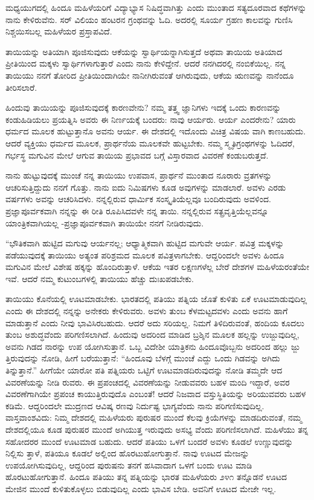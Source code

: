 ಮಧ್ಯಯುಗದಲ್ಲಿ ಹಿಂದೂ ಮಹಿಳೆಯರಿಗೆ ವಿದ್ಯಾಭ್ಯಾಸ ನಿಷಿದ್ಧವಾಗಿತ್ತು ಎಂದು ಮುಂತಾದ ಸತ್ಯದೂರವಾದ ಕಥೆಗಳನ್ನು ನಾನು ಕೇಳಿರುವೆನು. ಸರ್ ವಿಲಿಯಂ ಹಂಟರನ  ಗ್ರಂಥವನ್ನು ಓದಿ. ಅದರಲ್ಲಿ ಸೂರ್ಯ ಗ್ರಹಣ ಕಾಲವನ್ನು ಗುಣಿಸಿ ನಿಶ್ಚಯಿಸಬಲ್ಲ ಮಹಿಳೆಯರ ಪ್ರಸ್ತಾಪವಿದೆ.

ತಾಯಿಯನ್ನು ಅತಿಯಾಗಿ ಪೂಜಿಸುವುದು ಆಕೆಯನ್ನು ಸ್ವಾರ್ಥಿಯನ್ನಾಗಿಸುತ್ತದೆ ಅಥವಾ ತಾಯಿಯ ಅತಿಯಾದ ಪ್ರೀತಿಯಿಂದ ಮಕ್ಕಳು ಸ್ವಾರ್ಥಿಗಳಾಗುತ್ತಾರೆ ಎಂದು ನಾನು ಕೇಳಿದ್ದೇನೆ. ಆದರೆ ನನಗಿದರಲ್ಲಿ ನಂಬಿಕೆಯಿಲ್ಲ. ನನ್ನ ತಾಯಿಯು ನನಗೆ ತೋರಿದ ಪ್ರೀತಿಯಿಂದಾಗಿಯೇ ನಾನೀಗಿರುವಂತೆ ಆಗಿರುವುದು, ಆಕೆಯ ಋಣವನ್ನು ನಾನೆಂದೂ ತೀರಿಸಲಾರೆ.

ಹಿಂದುವು ತಾಯಿಯನ್ನು ಪೂಜಿಸುವುದಕ್ಕೆ ಕಾರಣವೇನು? ನಮ್ಮ ತತ್ತ್ವ ಜ್ಞಾನಿಗಳು ಇದಕ್ಕೆ ಒಂದು ಕಾರಣವನ್ನು ಕಂಡುಹಿಡಿಯಲು ಪ್ರಯತ್ನಿಸಿ ಅವರು ಈ ನಿರ್ಣಯಕ್ಕೆ ಬಂದರು: ನಾವು ಆರ್ಯರು. ಆರ್ಯ ಎಂದರೇನು? ಯಾರು ಧರ್ಮದ ಮೂಲಕ ಹುಟ್ಟುತ್ತಾನೊ ಅವನು ಆರ್ಯ. ಈ ದೇಶದಲ್ಲಿ ಇದೊಂದು ವಿಚಿತ್ರ ವಿಷಯ ವಾಗಿ ಕಾಣಬಹುದು. ಆದರೆ ವ್ಯಕ್ತಿಯು ಧರ್ಮದ ಮೂಲಕ, ಪ್ರಾರ್ಥನೆಯ ಮೂಲಕವೇ ಹುಟ್ಟಬೇಕು. ನಮ್ಮ ಸ್ಮೃತಿಗ್ರಂಥಗಳನ್ನು ಓದಿದರೆ, ಗರ್ಭಸ್ಥ ಮಗುವಿನ ಮೇಲೆ ಆಗುವ ತಾಯಿಯ ಪ್ರಭಾವದ ಬಗ್ಗೆ ವಿಸ್ತಾರವಾದ ವಿವರಣೆ ಕಂಡುಬರುತ್ತದೆ.

ನಾನು ಹುಟ್ಟುವುದಕ್ಕೆ ಮುಂಚೆ ನನ್ನ ತಾಯಿಯು ಉಪವಾಸ, ಪ್ರಾರ್ಥನೆ ಮುಂತಾದ ನೂರಾರು ವ್ರತಗಳನ್ನು ಆಚರಿಸುತ್ತಿದ್ದುದು ನನಗೆ ಗೊತ್ತು. ನಾನು ಐದು ನಿಮಿಷಗಳು ಕೂಡ ಅವುಗಳನ್ನು ಮಾಡಲಾರೆ. ಅವಳು ಎರಡು ವರ್ಷಗಳು ಅವನ್ನು ಆಚರಿಸಿದಳು. ನನ್ನಲ್ಲಿರುವ ಧಾರ್ಮಿಕ ಸಂಸ್ಕೃತಿಯೆಲ್ಲವೂ ಬಂದಿರುವುದು ಅವಳಿಂದ. ಪ್ರಜ್ಞಾಪೂರ್ವಕವಾಗಿ ನನ್ನನ್ನು ಈ ರೀತಿ ರೂಪಿಸಿದವಳೇ ನನ್ನ ತಾಯಿ. ನನ್ನಲ್ಲಿರುವ ಸತ್ಪ್ರವೃತ್ತಿಯೆಲ್ಲವನ್ನೂ ಯಾಂತ್ರಿಕವಾಗಿಯಲ್ಲ -ಪ್ರಜ್ಞಾಪೂರ್ವಕವಾಗಿ ತಾಯಿಯೇ ನನಗೆ ನೀಡಿರುವುದು.

“ಭೌತಿಕವಾಗಿ ಹುಟ್ಟಿದ ಮಗುವು ಆರ್ಯನಲ್ಲ; ಆಧ್ಯಾತ್ಮಿಕವಾಗಿ ಹುಟ್ಟಿದ ಮಗುವೇ ಆರ್ಯ. ಪವಿತ್ರ ಮಕ್ಕಳನ್ನು ಪಡೆಯುವುದಕ್ಕೆ ತಾಯಿಯು ಅತ್ಯಂತ ಪರಿಶ್ರಮದ ಮೂಲಕ ಪವಿತ್ರಳಾಗಬೇಕು. ಆದ್ದರಿಂದಲೇ ಅವಳು ಹಿಂದೂ ಮಗುವಿನ ಮೇಲೆ ವಿಶೇಷ ಹಕ್ಕನ್ನು ಹೊಂದಿರುತ್ತಾಳೆ. ಆಕೆಯ ಇತರ ಲಕ್ಷಣಗಳೆಲ್ಲ ಬೇರೆ ದೇಶಗಳ ಮಹಿಳೆಯರಂತೆಯೇ ಇವೆ. ಆದರೆ ನಮ್ಮ ಕುಟುಂಬಗಳಲ್ಲಿ ತಾಯಿಯು ಹೆಚ್ಚು ದುಃಖಪಡಬೇಕು.

ತಾಯಿಯು ಕೊನೆಯಲ್ಲಿ ಊಟಮಾಡಬೇಕು. ಭಾರತದಲ್ಲಿ ಪತಿಯು ಪತ್ನಿಯ ಜೊತೆ ಕುಳಿತು ಏಕೆ ಊಟಮಾಡುವುದಿಲ್ಲ ಎಂದು ಈ ದೇಶದಲ್ಲಿ ನನ್ನನ್ನು ಅನೇಕರು ಕೇಳಿರುವರು. ಅವಳು ತುಂಬ ಕೆಳಮಟ್ಟದವಳು ಎಂದು ಅವನು ಹಾಗೆ ಮಾಡುತ್ತಾನೆ ಎಂದು ನೀವು ಭಾವಿಸಿರಬಹುದು. ಆದರೆ ಅದು ಸರಿಯಲ್ಲ. ನಿಮಗೆ ತಿಳಿದಿರುವಂತೆ, ಹಂದಿಯ ಕೂದಲು ತುಂಬ ಅಶುದ್ಧವೆಂದು ಪರಿಗಣಿಸಲಾಗಿದೆ. ಹಿಂದುವು ಅದರಿಂದ ಮಾಡಿದ ಬ್ರಶ್ಶಿನ ಮೂಲಕ ಹಲ್ಲನ್ನು ಉಜ್ಜುವುದಿಲ್ಲ, ಅವನು ಗಿಡದ ನಾರನ್ನು ಉಪ ಯೋಗಿಸುತ್ತಾನೆ. ಒಬ್ಬ ವಿದೇಶೀ ಯಾತ್ರಿಕನು ಹಿಂದೂವೊಬ್ಬನು ಅದರಿಂದ ಹಲ್ಲು ಜ್ಜು ತ್ತಿರುವುದನ್ನು ನೋಡಿ, ಹೀಗೆ ಬರೆಯುತ್ತಾನೆ: “ಹಿಂದೂವು ಬೆಳಗ್ಗೆ ಮುಂಚೆ ಎದ್ದು ಒಂದು ಗಿಡವನ್ನು ಅಗಿದು ತಿನ್ನುತ್ತಾನೆ.” ಹೀಗೆಯೇ ಯಾರೋ ಪತಿ ಪತ್ನಿಯರು ಒಟ್ಟಿಗೆ ಊಟಮಾಡದಿರುವುದನ್ನು ನೋಡಿ ತಮ್ಮದೇ ಆದ ವಿವರಣೆಯನ್ನು ನೀಡಿ ರುವರು. ಈ ಪ್ರಪಂಚದಲ್ಲಿ ವಿವರಣೆಯನ್ನು ನೀಡುವವರು ಬಹಳ ಮಂದಿ ಇದ್ದಾರೆ, ಅವರ ವಿವರಣೆಗಾಗಿಯೇ ಪ್ರಪಂಚ ಕಾಯುತ್ತಿರುವುದೊ ಎಂಬಂತೆ! ಆದರೆ ನಿಜವಾದ ವಸ್ತುಸ್ಥಿತಿಯನ್ನು ಅರಿಯುವವರು ಬಹಳ ಕಡಿಮೆ. ಆದ್ದರಿಂದಲೇ ಮುದ್ರಣದ ಆವಿಷ್ಕ ರಣವು ನಿರ್ದುಷ್ಟ ಭಾಗ್ಯವೆಂದು ನಾನು ಪರಿಗಣಿಸುವುದಿಲ್ಲ. ವಾಸ್ತವಾಂಶವಿದು: ನಿಮ್ಮ ದೇಶದಲ್ಲಿ ಮಹಿಳೆಯರು ಪುರುಷರ ಮುಂದೆ ಕೆಲವು ಕ್ರಿಯೆಗಳನ್ನು ಮಾಡದಿರುವಂತೆ, ನಮ್ಮ ದೇಶದಲ್ಲಿಯೂ ಕೂಡ ಪುರುಷರ ಮುಂದೆ ಅಗಿಯುತ್ತ ಇರುವುದು ಅಸಭ್ಯ ವೆಂದು ಪರಿಗಣಿಸಲಾಗಿದೆ. ಮಹಿಳೆಯು ತನ್ನ ಸಹೋದರರ ಮುಂದೆ ಊಟಮಾಡ ಬಹುದು. ಆದರೆ ಪತಿಯು ಒಳಗೆ ಬಂದರೆ ಅವಳು ಕೂಡಲೆ ಉಣ್ಣುವುದನ್ನು ನಿಲ್ಲಿಸು ತ್ತಾಳೆ, ಪತಿಯೂ ಕೂಡಲೆ ಅಲ್ಲಿಂದ ಹೊರಟುಹೋಗುತ್ತಾನೆ. ನಾವು ಊಟದ ಮೇಜನ್ನು ಉಪಯೋಗಿಸುವುದಿಲ್ಲ, ಆದ್ದರಿಂದ ಪುರುಷನು ತನಗೆ ಹಸಿವಾದಾಗ ಒಳಗೆ ಬಂದು ಊಟ ಮಾಡಿ ಹೊರಟುಹೋಗುತ್ತಾನೆ. ಹಿಂದೂ ಪತಿಯು ತನ್ನ ಪತ್ನಿಯನ್ನು ಭಾರತ ಮಹಿಳೆಯರು ೨೪೧ ತನ್ನೊಡನೆ ಊಟದ ಮೇಜಿನ ಮುಂದೆ ಕುಳಿತುಕೊಳ್ಳಲು ಬಿಡುವುದಿಲ್ಲ ಎಂದು ಭಾವಿಸ ಬೇಡಿ. ಅವನಿಗೆ ಊಟದ ಮೇಜೇ ಇಲ್ಲ.

